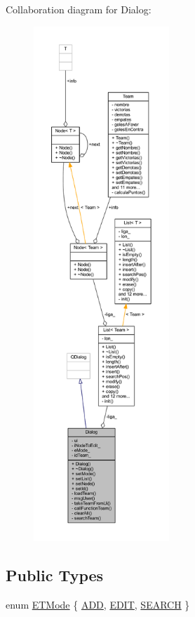 Collaboration diagram for Dialog\+:\nopagebreak
\begin{figure}[H]
\begin{center}
\leavevmode
\includegraphics[height=550pt]{d6/d66/class_dialog__coll__graph}
\end{center}
\end{figure}
\subsection*{Public Types}
\begin{DoxyCompactItemize}
\item 
enum \hyperlink{class_dialog_ae78164fb050172481b9bc05bdbbdc9b0}{E\+T\+Mode} \{ \hyperlink{class_dialog_ae78164fb050172481b9bc05bdbbdc9b0a382169df655aea6ae97508c2cbba7d3e}{A\+D\+D}, 
\hyperlink{class_dialog_ae78164fb050172481b9bc05bdbbdc9b0a89d44aa4439f5e2be5a9e99935813385}{E\+D\+I\+T}, 
\hyperlink{class_dialog_ae78164fb050172481b9bc05bdbbdc9b0a3ee13ecddf383e1872ad53f5f1947ef1}{S\+E\+A\+R\+C\+H}
 \}
\end{DoxyCompactItemize}
